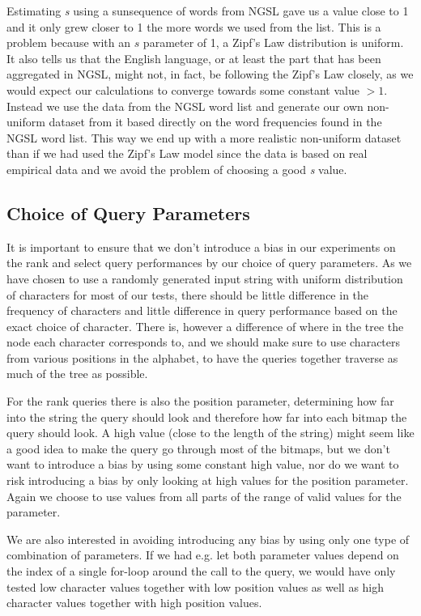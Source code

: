 Estimating \textit{s} using a sunsequence of words from NGSL gave us a value close to 1 and it only grew closer to 1 the more words we used from the list.
This is a problem because with an $s$ parameter of 1, a Zipf's Law distribution is uniform.
It also tells us that the English language, or at least the part that has been aggregated in NGSL, might not, in fact, be following the Zipf's Law closely, as we would expect our calculations to converge towards some constant value $>1$.
Instead we use the data from the NGSL word list and generate our own non-uniform dataset from it based directly on the word frequencies found in the NGSL word list.
This way we end up with a more realistic non-uniform dataset than if we had used the Zipf's Law model since the data is based on real empirical data and we avoid the problem of choosing a good \textit{s} value.


\subsection{Choice of Query Parameters}
\label{sec:choiceOfQueryParameters}
It is important to ensure that we don't introduce a bias in our experiments on the rank and select query performances by our choice of query parameters.
As we have chosen to use a randomly generated input string with uniform distribution of characters for most of our tests, there should be little difference in the frequency of characters and little difference in query performance based on the exact choice of character.
There is, however a difference of where in the tree the node each character corresponds to, and we should make sure to use characters from various positions in the alphabet, to have the queries together traverse as much of the tree as possible.

For the rank queries there is also the position parameter, determining how far into the string the query should look and therefore how far into each bitmap the query should look.
A high value (close to the length of the string) might seem like a good idea to make the query go through most of the bitmaps, but we don't want to introduce a bias by using some constant high value, nor do we want to risk introducing a bias by only looking at high values for the position parameter.
Again we choose to use values from all parts of the range of valid values for the parameter.

We are also interested in avoiding introducing any bias by using only one type of combination of parameters.
If we had e.g. let both parameter values depend on the index of a single for-loop around the call to the query, we would have only tested low character values together with low position values as well as high character values together with high position values.

